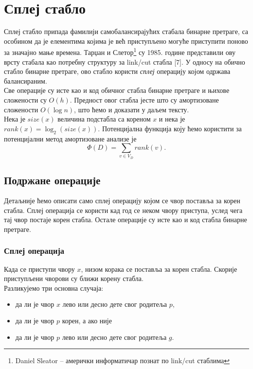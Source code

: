 \documentclass[11pt, a4paper]{article}
\theoremstyle{remark}
\numberwithin{equation}{section}
\begin{document}
	\newpage
	
	\section{Сплеј стабло}
	Сплеј стабло припада фамилији самобалансирајућих стабала бинарне претраге, са особином да је елементима којима је већ приступљено могуће приступити поново за значајно мање времена. Тарџан и Слетор\footnote{Daniel Sleator -- амерички информатичар познат по link/cut стаблима} су 1985. године представили ову врсту стабала као потребну структуру за link/cut стабла [7]. У односу на обично стабло бинарне претраге, ово стабло користи \textit{сплеј} операцију којом одржава балансираним. \\
	
	\noindent Све операције су исте као и код обичног стабла бинарне претраге и њихове сложености су $O(h)$. Предност овог стабла јесте што су амортизоване сложености $O(\log n)$, што ћемо и доказати у даљем тексту. \\
	
	\noindent Нека је $size(x)$ величина подстабла са кореном $x$ и нека је $rank(x)=\log_2 (size(x))$. Потенцијална функција коју ћемо користити за потенцијални метод амортизоване анализе је 
	\begin{equation}
		\Phi (D)=\sum_{v \in V_D} rank(v).
	\end{equation}
	
	\subsection{Подржане операције}
	
	Детаљније ћемо описати само сплеј операцију којом се чвор поставља за корен стабла. Сплеј операција се користи кад год се неком чвору приступа, услед чега тај чвор постаје корен стабла. Остале операције су исте као и код стабла бинарне претраге.
	
	\subsubsection*{Сплеј операција}
	Када се приступи чвору $x$, низом корака се поставља за корен стабла. Скорије приступљени чворови су ближи корену стабла. \\
	
	\noindent Разликујемо три основна случаја:
	
		\begin{itemize}
			\item да ли је чвор $x$ лево или десно дете свог родитеља $p$,
			\item да ли је чвор $p$ корен, а ако није
			\item да ли је чвор $p$ лево или десно дете свог родитеља $g$.
		\end{itemize}
	
\end{document}
